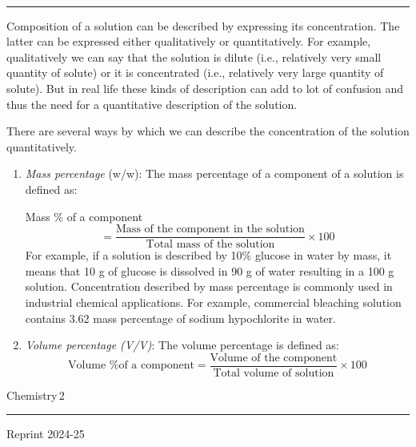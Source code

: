 \documentclass[11pt,a4paper]{article}
\begin{document}
\vspace{6pt}
\noindent\begin{minipage}[t]{0.25\textwidth}
\vspace{0pt}
\\[-2pt]
{\color{salmon}\rule{\linewidth}{1.4pt}}
\end{minipage}\hfill
\begin{minipage}[t]{0.735\textwidth}
\vspace{0pt}
Composition of a solution can be described by expressing its concentration. The latter can be expressed either qualitatively or quantitatively. For example, qualitatively we can say that the solution is dilute (i.e., relatively very small quantity of solute) or it is concentrated (i.e., relatively very large quantity of solute). But in real life these kinds of description can add to lot of confusion and thus the need for a quantitative description of the solution.

\hspace*{1.5em}There are several ways by which we can describe the concentration of the solution quantitatively.
\begin{enumerate}[label=(\roman*),leftmargin=24pt,itemsep=4pt,topsep=4pt]
\item \textit{Mass percentage} (w/w): The mass percentage of a component of a solution is defined as:

Mass \% of a component
\[ = \frac{\text{Mass of the component in the solution}}{\text{Total mass of the solution}} \times 100 \tag{1.1} \]
For example, if a solution is described by 10\% glucose in water by mass, it means that 10 g of glucose is dissolved in 90 g of water resulting in a 100 g solution. Concentration described by mass percentage is commonly used in industrial chemical applications. For example, commercial bleaching solution contains 3.62 mass percentage of sodium hypochlorite in water.
\item \textit{Volume percentage (V/V)}: The volume percentage is defined as:
\[ \text{Volume \% of a component} = \frac{\text{Volume of the component}}{\text{Total volume of solution}} \times 100 \tag{1.2} \]
\end{enumerate}
\end{minipage}

\vfill
\noindent\begin{minipage}{0.3\textwidth}
{\color{gray}Chemistry}\hspace{6pt}\colorbox{Goldenrod1}{\color{gray}\,2\,}\\[-6pt]
{\color{Goldenrod1}\rule{\linewidth}{1pt}}
\end{minipage}
\begin{center}
{\sffamily\small Reprint 2024-25}
\end{center}
\end{document}
